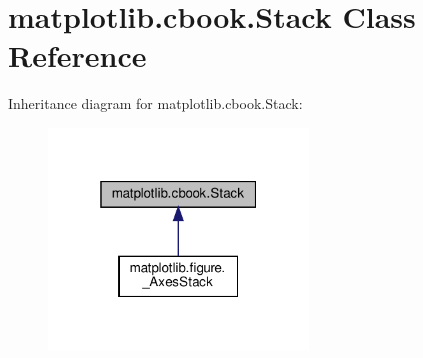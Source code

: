 \hypertarget{classmatplotlib_1_1cbook_1_1Stack}{}\section{matplotlib.\+cbook.\+Stack Class Reference}
\label{classmatplotlib_1_1cbook_1_1Stack}


Inheritance diagram for matplotlib.\+cbook.\+Stack\+:
\nopagebreak
\begin{figure}[H]
\begin{center}
\leavevmode
\includegraphics[width=196pt]{classmatplotlib_1_1cbook_1_1Stack__inherit__graph}
\end{center}
\end{figure}
